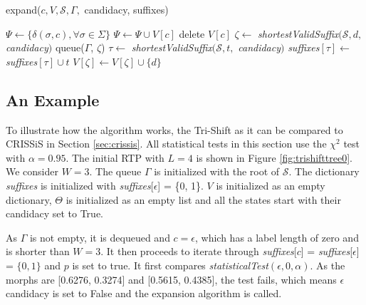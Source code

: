 {  \begin{algorithm}[t]
  \caption{expand($c, V, \mathcal{S},\Gamma,$ candidacy, suffixes)\label{alg:expand}}
    \begin{algorithmic}[1]
      	\State $\Psi \gets \{\delta(\sigma,c),\forall \sigma \in \Sigma\}$
      		\State $\Psi \gets \Psi \cup V[c]$
      		\State delete $V[c]$
      	\EndIf
      		\State $\zeta \gets $ \textit{shortestValidSuffix}$(\mathcal{S}, d,$ \textit{candidacy}$)$
      			\State queue($\Gamma$, $\zeta$)
      				\State $\tau \gets $ \textit{shortestValidSuffix}$(\mathcal{S}, t,$ \textit{candidacy}$)$
      				\State \textit{suffixes}$[\tau] \gets$ \textit{suffixes}$[\tau] \cup t$
      			\EndFor
      		\Else
      			\State $V[\zeta] \gets V[\zeta]\cup\{d\}$
      		\EndIf
      	\EndFor
      \EndProcedure
    \end{algorithmic}
  \end{algorithm}

\subsection{An Example}

To illustrate how the algorithm works, the Tri-Shift as it can be compared to CRISSiS in Section \ref{sec:crissis}. All statistical tests in this section use the $\chi^2$ test with $\alpha = 0.95$. The initial RTP with $L = 4$ is shown in Figure \ref{fig:trishifttree0}. We consider $W=3$.  The queue $\Gamma$ is initialized with the root of $\mathcal{S}$. The dictionary \textit{suffixes} is initialized with  \textit{suffixes}[$\epsilon$] = \{0, 1\}. $V$ is initialized as an empty dictionary, $\Theta$ is initialized as an empty list and all the states start with their candidacy set to True.

As $\Gamma$ is not empty, it is dequeued and $c = \epsilon$, which has a label length of zero and is shorter than $W = 3$. It then proceeds to iterate through \textit{suffixes}[$c$] = \textit{suffixes}[$\epsilon$] = $\{0, 1\}$ and $p$ is set to true. It first compares \textit{statisticalTest}$(\epsilon, 0, \alpha)$. As the morphs are [0.6276, 0.3274] and [0.5615, 0.4385], the test fails, which means $\epsilon$ candidacy is set to False and the expansion algorithm is called. 

}
